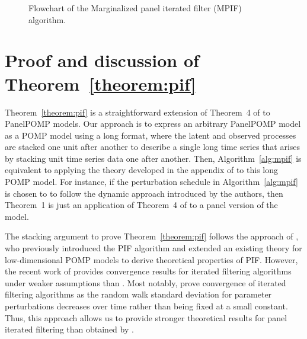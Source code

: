\documentclass[12pt]{article}\usepackage[]{graphicx}\usepackage[]{xcolor}
\begin{document}
\begin{appendices}
\begin{figure}[htbp]
{%
}
\caption{Flowchart of the Marginalized panel iterated filter (MPIF) algorithm.}
\label{fig:mpif_flowchart}
\end{figure}

\section{Proof and discussion of Theorem~\ref{theorem:pif}}\label{sec:panelTheory}

  Theorem~\ref{theorem:pif} is a straightforward extension of Theorem~4 of \citet{chen25} to PanelPOMP models.
  Our approach is to express an arbitrary PanelPOMP model as a POMP model using a long format, where the latent and observed processes are stacked one unit after another to describe a single long time series that arises by stacking unit time series data one after another.
  Then, Algorithm~\ref{alg:mpif} is equivalent to applying the theory developed in the appendix of \citet{chen25} to this long POMP model.
  For instance, if the perturbation schedule in Algorithm~\ref{alg:mpif} is chosen to to follow the dynamic approach introduced by the authors, then Theorem~1 is just an application of Theorem~4 of \citet{chen25} to a panel version of the model.

  The stacking argument to prove Theorem~\ref{theorem:pif} follows the approach of \citet{breto20}, who previously introduced the PIF algorithm and extended an existing theory for low-dimensional POMP models \citep{ionides15} to derive theoretical properties of PIF.
  However, the recent work of \citet{chen25} provides convergence results for iterated filtering algorithms under weaker assumptions than \citet{ionides15}.
  Most notably, \citet{chen25} prove convergence of iterated filtering algorithms as the random walk standard deviation for parameter perturbations decreases over time rather than being fixed at a small constant.
  Thus, this approach allows us to provide stronger theoretical results for panel iterated filtering than obtained by \citet{breto20}.


\end{appendices}
\end{document}
